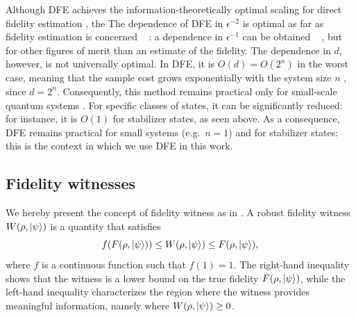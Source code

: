 \documentclass[a4paper,twocolumn,11pt,unpublished]{../../revision/quantumarticle}
\providecommand{\DIFadd}[1]{{\protect\color{blue} \sf #1}} %
\providecommand{\DIFdel}[1]{{\protect\color{red} \scriptsize #1}} %
\providecommand{\DIFaddbegin}{} %
\providecommand{\DIFaddend}{} %
\providecommand{\DIFdelbegin}{} %
\providecommand{\DIFdelend}{} %
\begin{document}
\DIFdelbegin \DIFdel{Although DFE achieves the information-theoretically optimal scaling for direct fidelity estimation , the }\DIFdelend \DIFaddbegin \DIFadd{The dependence of DFE in $\epsilon^{-2}$ is optimal as far as fidelity estimation is concerned \mbox{%
\cite{FOS24optimal}}\hskip0pt%
: a dependence in $\epsilon^{-1}$ can be obtained \mbox{%
\cite{DHZ20Optimal}}\hskip0pt%
, but for other figures of merit than an estimate of the fidelity. The dependence in $d$, however, is not universally optimal. In DFE, it is $O(d)=O(2^n)$ in the worst case, meaning that the }\DIFaddend sample cost grows exponentially with the system size $n$\DIFdelbegin \DIFdel{, since $d = 2^n$. Consequently, this method remains practical only for small-scale quantum systems }\DIFdelend \DIFaddbegin \DIFadd{. For specific classes of states, it can be significantly reduced: for instance, it is $O(1)$ for stabilizer states, as seen above. As a consequence, DFE remains practical for small systems (e.g.\ $n=1$) and for stabilizer states: this is the context in which we use DFE in this work}\DIFaddend .

\subsection{Fidelity witnesses}
\label{subsection:prelims:witness}
We hereby present the concept of fidelity witness as in \cite{CGKM21efficient, UC24efficient}. A {robust fidelity witness} $W(\rho, \ket{\psi})$ is a quantity that satisfies
\begin{equation}
\label{eq: robust fidelity witness}
    f(F(\rho, \ket{\psi}))
    \leq W(\rho, \ket{\psi}) 
    \leq F(\rho, \ket{\psi}) ,
\end{equation}
where $f$ is a continuous function such that $f(1) = 1$. 
The right-hand inequality shows that the witness is a {lower bound} on the true fidelity $F(\rho, \ket{\psi})$, while the left-hand inequality characterizes the region where the witness provides meaningful information, namely where $W(\rho, \ket{\psi}) \ge 0$.
\end{document}
